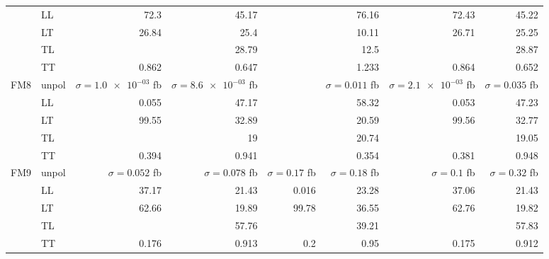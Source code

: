 \begin{table}[h]
{\begin{tabular}{llrrrrrr}
 & LL & \num{72.3} & \num{45.17} &  & \num{76.16} & \num{72.43} & \num{45.22} \\
 & LT & \num{26.84} & \num{25.4} &  & \num{10.11} & \num{26.71} & \num{25.25} \\
 & TL &  & \num{28.79} &  & \num{12.5} &  & \num{28.87} \\
 & TT & \num{0.862} & \num{0.647} &  & \num{1.233} & \num{0.864} & \num{0.652} \\
\midrule
\multirow{5}{*}{FM8}
 & unpol & $\sigma = \num{1.0e-03}$ fb & $\sigma = \num{8.6e-03}$ fb &  & $\sigma = \num{0.011}$ fb & $\sigma = \num{2.1e-03}$ fb & $\sigma = \num{0.035}$ fb \\
 & LL & \num{0.055} & \num{47.17} &  & \num{58.32} & \num{0.053} & \num{47.23} \\
 & LT & \num{99.55} & \num{32.89} &  & \num{20.59} & \num{99.56} & \num{32.77} \\
 & TL &  & \num{19} &  & \num{20.74} &  & \num{19.05} \\
 & TT & \num{0.394} & \num{0.941} &  & \num{0.354} & \num{0.381} & \num{0.948} \\
\midrule
\multirow{5}{*}{FM9}
 & unpol & $\sigma = \num{0.052}$ fb & $\sigma = \num{0.078}$ fb & $\sigma = \num{0.17}$ fb & $\sigma = \num{0.18}$ fb & $\sigma = \num{0.1}$ fb & $\sigma = \num{0.32}$ fb \\
 & LL & \num{37.17} & \num{21.43} & \num{0.016} & \num{23.28} & \num{37.06} & \num{21.43} \\
 & LT & \num{62.66} & \num{19.89} & \num{99.78} & \num{36.55} & \num{62.76} & \num{19.82} \\
 & TL &  & \num{57.76} &  & \num{39.21} &  & \num{57.83} \\
 & TT & \num{0.176} & \num{0.913} & \num{0.2} & \num{0.95} & \num{0.175} & \num{0.912} \\
\bottomrule
\end{tabular}
}%
\end{table}